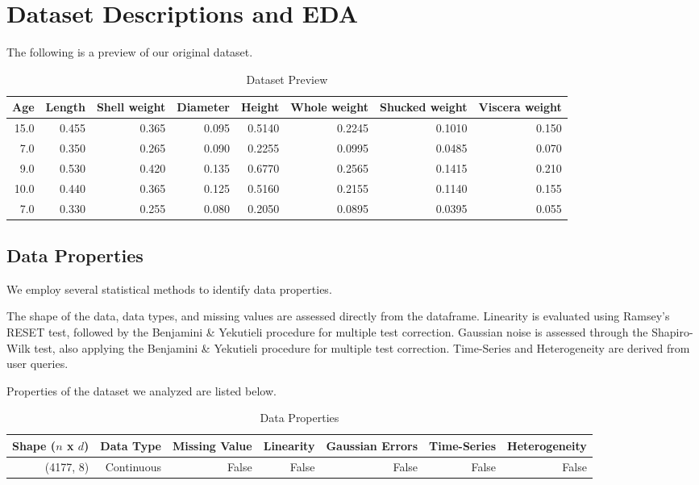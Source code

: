 \documentclass{article}
\begin{document}
\section{Dataset Descriptions and EDA}
The following is a preview of our original dataset.

\begin{table}[H]
    \centering
    \caption{Dataset Preview}
    \begin{tabular}{rrrrrrrr}
\toprule
 Age &  Length &  Shell weight &  Diameter &  Height &  Whole weight &  Shucked weight &  Viscera weight \\
\midrule
15.0 &   0.455 &         0.365 &     0.095 &  0.5140 &        0.2245 &          0.1010 &           0.150 \\
 7.0 &   0.350 &         0.265 &     0.090 &  0.2255 &        0.0995 &          0.0485 &           0.070 \\
 9.0 &   0.530 &         0.420 &     0.135 &  0.6770 &        0.2565 &          0.1415 &           0.210 \\
10.0 &   0.440 &         0.365 &     0.125 &  0.5160 &        0.2155 &          0.1140 &           0.155 \\
 7.0 &   0.330 &         0.255 &     0.080 &  0.2050 &        0.0895 &          0.0395 &           0.055 \\
\bottomrule
\end{tabular}
\end{table}

\subsection{Data Properties}
We employ several statistical methods to identify data properties.

The shape of the data, data types, and missing values are assessed directly from the dataframe.
Linearity is evaluated using Ramsey’s RESET test, followed by the Benjamini \& Yekutieli procedure for multiple test correction.
Gaussian noise is assessed through the Shapiro-Wilk test, also applying the Benjamini \& Yekutieli procedure for multiple test correction.
Time-Series and Heterogeneity are derived from user queries.

Properties of the dataset we analyzed are listed below.

\begin{table}[H]
    \centering
    \caption{Data Properties}
    \begin{tabular}{rrrrrrr}
\toprule
Shape ($n$ x $d$) & Data Type & Missing Value & Linearity & Gaussian Errors & Time-Series & Heterogeneity \\
\midrule
(4177, 8)   & Continuous & False & False & False & False & False \\
\bottomrule
\end{tabular}
\end{table}
\end{document}
